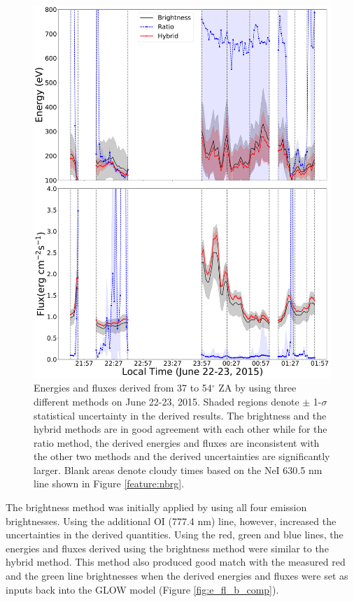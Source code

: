 \documentclass[crop=false,class=mitthesis,oneside,font=12pt]{standalone}
\begin{document}
\begin{figure}[H]
	\centering\includegraphics[width=30pc]{different_method_e_fl.pdf}
	\caption{Energies and fluxes derived from 37 to 54$^\circ$ ZA by using three different methods on June 22-23, 2015. Shaded regions denote $\pm$ 1-$\sigma$ statistical uncertainty in the derived results. The brightness and the hybrid methods are in good agreement with each other while for the ratio method, the derived energies and fluxes are inconsistent with the other two methods and the derived uncertainties are significantly larger. Blank areas denote cloudy times based on the NeI 630.5 nm line shown in Figure \ref{feature:nbrg}.}
	\label{fig:e_fl_3mtd}
\end{figure}

The brightness method was initially applied by using all four emission brightnesses. Using the additional OI (777.4 nm) line, however, increased the uncertainties in the derived quantities. Using the red, green and blue lines, the energies and fluxes derived using the brightness method were similar to the hybrid method. This method also produced good match with the measured red and the green line brightnesses when the derived energies and fluxes were set as inputs back into the GLOW model (Figure \ref{fig:e_fl_b_comp}). 
\end{document}
